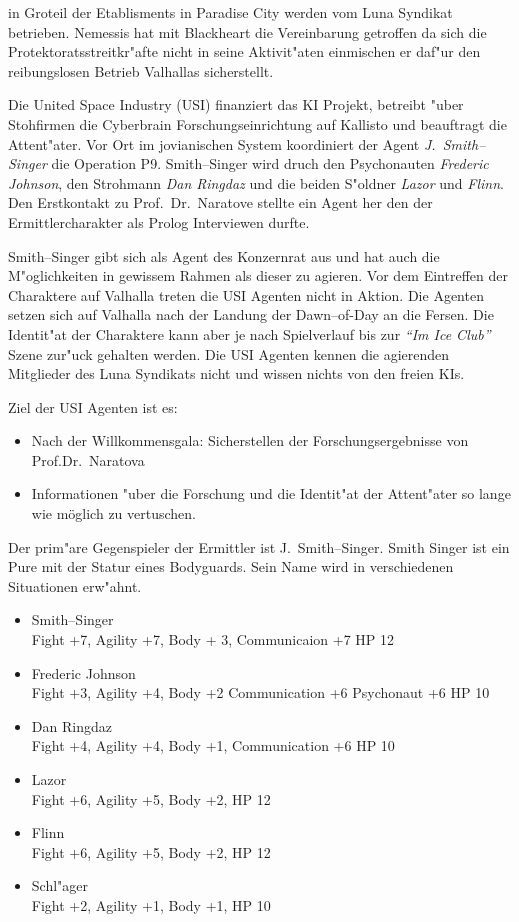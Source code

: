in Gro\3teil der Etablisments in Paradise City werden vom Luna Syndikat betrieben. Nemessis hat mit Blackheart die Vereinbarung getroffen da\3 sich die Protektoratsstreitkr"afte nicht in seine Aktivit"aten einmischen er daf"ur den reibungslosen Betrieb Valhallas sicherstellt.


\newpage
{}

Die United Space Industry (USI) finanziert das KI Projekt, betreibt "uber Stohfirmen die Cyberbrain Forschungseinrichtung auf Kallisto und beauftragt die Attent"ater. Vor Ort im jovianischen System koordiniert der Agent \emph{J.~Smith--Singer} die Operation P9. Smith--Singer wird druch den Psychonauten \emph{Frederic Johnson}, den Strohmann \emph{Dan Ringdaz} und die beiden S"oldner \emph{Lazor} und \emph{Flinn}. Den Erstkontakt zu Prof.~Dr.~Naratove stellte ein Agent her den der Ermittlercharakter als Prolog Interviewen durfte.

Smith--Singer gibt sich als Agent des Konzernrat aus und hat auch die M"oglichkeiten in gewissem Rahmen als dieser zu agieren. Vor dem Eintreffen der Charaktere auf Valhalla treten die USI Agenten nicht in Aktion. Die Agenten setzen sich auf Valhalla nach der Landung der Dawn--of-Day an die Fersen. Die Identit"at der Charaktere kann aber je nach Spielverlauf bis zur \emph{"`Im Ice Club"'} Szene zur"uck gehalten werden. Die USI Agenten kennen die agierenden Mitglieder des Luna Syndikats nicht und wissen nichts von den freien KIs.

Ziel der USI Agenten ist es:

\begin{itemize}
    \item Nach der Willkommensgala: Sicherstellen der Forschungsergebnisse von Prof.Dr.~Naratova
    \item Informationen "uber die Forschung und die Identit"at der Attent"ater so lange wie möglich zu vertuschen.    
\end{itemize}

Der prim"are Gegenspieler der Ermittler ist J.~Smith--Singer. Smith Singer ist ein Pure mit der Statur eines Bodyguards. Sein Name wird in verschiedenen Situationen erw"ahnt.

\begin{itemize}
    \item Smith--Singer \\
          Fight +7, Agility +7, Body + 3, Communicaion +7 HP 12
    \item Frederic Johnson\\
          Fight +3, Agility +4, Body +2 Communication +6 Psychonaut +6 HP 10
    \item Dan Ringdaz\\
          Fight +4, Agility +4, Body +1, Communication +6 HP 10
    \item Lazor\\
          Fight +6, Agility +5,  Body +2, HP 12
    \item Flinn\\
          Fight +6, Agility +5,  Body +2, HP 12
    \item Schl"ager\\
          Fight +2, Agility +1, Body +1, HP 10
\end{itemize}

